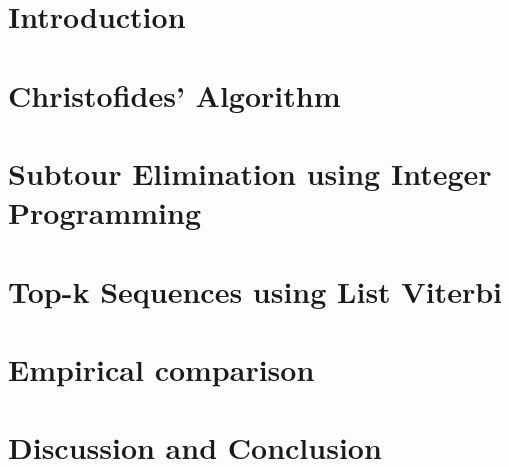 \documentclass[sigconf]{acmart}
\begin{document}

\maketitle

\section{Introduction}


\section{Christofides' Algorithm}
\label{sec:christofides}


\section{Subtour Elimination using Integer Programming}


\section{Top-k Sequences using List Viterbi}
\label{sec:viterbi}


%

\section{Empirical comparison}
\label{sec:experiments}


\section{Discussion and Conclusion}
\label{sec:discussion}




 
\end{document}
